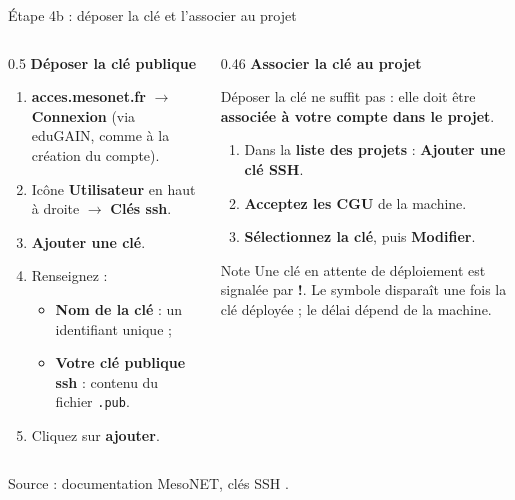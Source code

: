 \documentclass[8pt,aspectratio=169]{beamer}
\newcommand{\src}[1]{\vfill{\tiny\color{gray}Source : #1\par}}
\begin{document}
\begin{frame}{Étape 4b : déposer la clé et l'associer au projet}
\begin{columns}[T]
\begin{column}{0.5\textwidth}
\textbf{Déposer la clé publique}
\begin{enumerate}
\item \textbf{acces.mesonet.fr} $\to$ \textbf{Connexion} (via eduGAIN, comme à la création du compte).
\item Icône \textbf{Utilisateur} en haut à droite $\to$ \textbf{Clés ssh}.
\item \textbf{Ajouter une clé}.
\item Renseignez :
 \begin{itemize}
 \item \textbf{Nom de la clé} : un identifiant unique ;
 \item \textbf{Votre clé publique ssh} : contenu du fichier \texttt{.pub}.
 \end{itemize}
\item Cliquez sur \textbf{ajouter}.
\end{enumerate}
\end{column}
\begin{column}{0.46\textwidth}
\textbf{Associer la clé au projet}

\smallskip
Déposer la clé ne suffit pas : elle doit être \textbf{associée à votre compte dans le projet}.
\begin{enumerate}
\item Dans la \textbf{liste des projets} : \textbf{Ajouter une clé SSH}.
\item \textbf{Acceptez les CGU} de la machine.
\item \textbf{Sélectionnez la clé}, puis \textbf{Modifier}.
\end{enumerate}
\begin{block}{Note}
Une clé en attente de déploiement est signalée par \textbf{\textcolor{hpcorange}{!}}. Le symbole disparaît une fois la clé déployée ; le délai dépend de la machine.
\end{block}
\end{column}
\end{columns}
\src{documentation MesoNET, \og clés SSH \fg.}
\end{frame}
\end{document}
